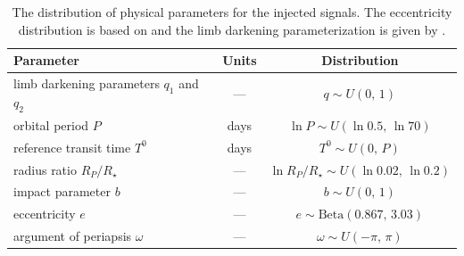 \documentclass[12pt,preprint]{aastex}
\newcommand{\tablabel}[1]{\label{tab:#1}}
\newcommand{\period}{{\ensuremath{P}}}
\newcommand{\phase}{{\ensuremath{T^0}}}
\newcommand{\impact}{{\ensuremath{b}}}
\newcommand{\ecc}{{\ensuremath{e}}}
\newcommand{\pomega}{{\ensuremath{\omega}}}
\begin{document}
\clearpage

\begin{table}[p]
\begin{center}
\begin{tabular}{lcc}
\toprule
Parameter & Units & Distribution \\
\midrule

limb darkening parameters $q_1$ and $q_2$ & --- & $q \sim U(0,\,1)$ \\
orbital period \period & days & $\ln \period \sim U(\ln 0.5,\,\ln 70)$ \\
reference transit time \phase & days & $\phase \sim U(0,\,\period)$ \\
radius ratio $R_P/R_\star$ & --- & $\ln R_P/R_\star \sim U(\ln 0.02,\,\ln 0.2)$ \\
impact parameter \impact & --- & $\impact \sim U(0,\,1)$ \\
eccentricity \ecc & --- & $\ecc \sim \mathrm{Beta}(0.867,\,3.03)$ \\
argument of periapsis \pomega & --- & $\pomega \sim U(-\pi,\,\pi)$ \\

\bottomrule
\end{tabular}
\end{center}
\caption{%
The distribution of physical parameters for the injected signals.
The eccentricity distribution is based on \citet{kipping-ecc} and the
limb darkening parameterization is given by \citet{kipping-ld}.
\tablabel{dist}}
\end{table}

\begin{table}[p]
\begin{center}
\small

\end{center}
\caption{%
The catalog of planet candidates and their observable properties.
These values and their uncertainties are derived from MCMC samplings and the
numbers are computed as the 0.16, 0.5, and 0.84 posterior sample quantiles.
The coordinates are retrieved directly from the EPIC.
\tablabel{cand}}
\end{table}
\end{document}
